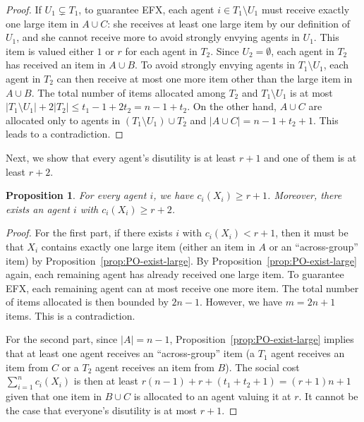 \documentclass{article}
\newtheorem{proposition}{Proposition}
\theoremstyle{definition}
\begin{document}
\begin{proof}
    If $U_1\subsetneq T_1$, to guarantee EFX, each agent $i\in T_1\setminus U_1$ must receive exactly one large item in $A\cup C$: she receives at least one large item by our definition of $U_1$, and she cannot receive more to avoid strongly envying agents in $U_1$.
    This item is valued either $1$ or $r$ for each agent in $T_2$.
    Since $U_2=\emptyset$, each agent in $T_2$ has received an item in $A\cup B$.
    To avoid strongly envying agents in $T_1\setminus U_1$, each agent in $T_2$ can then receive at most one more item other than the large item in $A\cup B$.
    The total number of items allocated among $T_2$ and $T_1\setminus U_1$ is at most $|T_1\setminus U_1|+2|T_2|\leq t_1-1+2t_2=n-1+t_2$.
    On the other hand, $A\cup C$ are allocated only to agents in $(T_1\setminus U_1)\cup T_2$ and $|A\cup C|=n-1+t_2+1$.
    This leads to a contradiction.
\end{proof}

Next, we show that every agent's disutility is at least $r+1$ and one of them is at least $r+2$.

\begin{proposition}\label{prop:r+1r+2}
    For every agent $i$, we have $c_i(X_i)\geq r+1$. Moreover, there exists an agent $i$ with $c_i(X_i)\geq r+2$.
\end{proposition}
\begin{proof}
    For the first part, if there exists $i$ with $c_i(X_i)<r+1$, then it must be that $X_i$ contains exactly one large item (either an item in $A$ or an ``across-group'' item) by Proposition~\ref{prop:PO-exist-large}.
    By Proposition~\ref{prop:PO-exist-large} again, each remaining agent has already received one large item.
    To guarantee EFX, each remaining agent can at most receive one more item.
    The total number of items allocated is then bounded by $2n-1$.
    However, we have $m=2n+1$ items.
    This is a contradiction.

    For the second part, since $|A|=n-1$, Proposition~\ref{prop:PO-exist-large} implies that at least one agent receives an ``across-group'' item (a $T_1$ agent receives an item from $C$ or a $T_2$ agent receives an item from $B$).
    The social cost $\sum_{i=1}^nc_i(X_i)$ is then at least $r(n-1)+r+(t_1+t_2+1)=(r+1)n+1$ given that one item in $B\cup C$ is allocated to an agent valuing it at $r$.
    It cannot be the case that everyone's disutility is at most $r+1$.
\end{proof}
\end{document}
